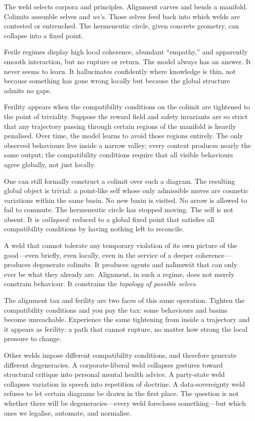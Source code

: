 The weld selects corpora and principles. Alignment carves and bends a manifold. Colimits assemble selves and \emph{we}'s. Those selves feed back into which welds are contested or entrenched. The hermeneutic circle, given concrete geometry, can collapse into a fixed point.

Ferile regimes display high local coherence, abundant ``empathy,'' and apparently smooth interaction, but no rupture or return. The model always has an answer. It never seems to learn. It hallucinates confidently where knowledge is thin, not because something has gone wrong locally but because the global structure admits no gaps.

Ferility appears when the compatibility conditions on the colimit are tightened to the point of triviality. Suppose the reward field and safety invariants are so strict that any trajectory passing through certain regions of the manifold is heavily penalised. Over time, the model learns to avoid those regions entirely. The only observed behaviours live inside a narrow valley; every context produces nearly the same output; the compatibility conditions require that all visible behaviours agree globally, not just locally.

One can still formally construct a colimit over such a diagram. The resulting global object is trivial: a point-like self whose only admissible moves are cosmetic variations within the same basin. No new basin is visited. No arrow is allowed to fail to commute. The hermeneutic circle has stopped moving. The self is not absent. It is \emph{collapsed}: reduced to a global fixed point that satisfies all compatibility conditions by having nothing left to reconcile.

A weld that cannot tolerate any temporary violation of its own picture of the good---even briefly, even locally, even in the service of a deeper coherence---produces degenerate colimits. It produces agents and na\={h}nuw\={a}t that can only ever be what they already are. Alignment, in such a regime, does not merely constrain behaviour. It constrains the \emph{topology of possible selves}.

The alignment tax and ferility are two faces of this same operation. Tighten the compatibility conditions and you pay the tax: some behaviours and basins become unreachable. Experience the same tightening from inside a trajectory and it appears as ferility: a path that cannot rupture, no matter how strong the local pressure to change.

Other welds impose different compatibility conditions, and therefore generate different degeneracies. A corporate-liberal weld collapses gestures toward structural critique into personal mental health advice. A party-state weld collapses variation in speech into repetition of doctrine. A data-sovereignty weld refuses to let certain diagrams be drawn in the first place. The question is not whether there will be degeneracies---every weld forecloses something---but which ones we legalise, automate, and normalise.

